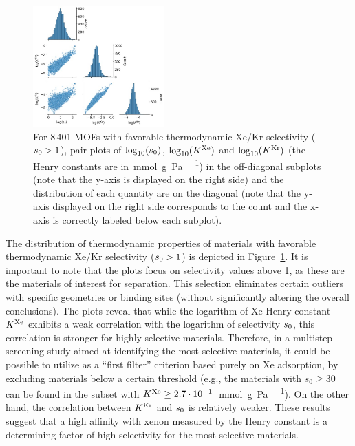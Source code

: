 \documentclass[main.tex]{subfiles}
\begin{document}
\begin{figure}[h]
  \centering
    \includegraphics[width=0.45\textwidth]{figures/2-thermo/Henry_0.jpg}
    \caption{For 8\,401 MOFs with favorable thermodynamic Xe/Kr selectivity ($s_{\text{0}} > 1$), pair plots of $\log_{\text{10}}(s_{\text{0}})$, $\log_{\text{10}}(K^{\text{Xe}})$ and $\log_{\text{10}}(K^{\text{Kr}})$ (the Henry constants are in~\si{\milli\mol\per\gram\per\pascal}) in the off-diagonal subplots (note that the y-axis is displayed on the right side) and the distribution of each quantity are on the diagonal (note that the y-axis displayed on the right side corresponds to the count and the x-axis is correctly labeled below each subplot).}\label{fgr:histo_K}
  \end{figure}
  
The distribution of thermodynamic properties of materials with favorable thermodynamic Xe/Kr selectivity ($s_{\text{0}} > 1$) is depicted in Figure~\ref{fgr:histo_K}. It is important to note that the plots focus on selectivity values above 1, as these are the materials of interest for separation. This selection eliminates certain outliers with specific geometries or binding sites (without significantly altering the overall conclusions). The plots reveal that while the logarithm of Xe Henry constant $K^{\text{Xe}}$ exhibits a weak correlation with the logarithm of selectivity $s_{\text{0}}$, this correlation is stronger for highly selective materials. Therefore, in a multistep screening study aimed at identifying the most selective materials, it could be possible to utilize as a ``first filter'' criterion based purely on Xe adsorption, by excluding materials below a certain threshold (e.g., the materials with $s_0\ge30$ can be found in the subset with $K^{\text{Xe}}\ge2.7\cdot10^{-1}$~\si{\milli\mol\per\gram\per\pascal}). On the other hand, the correlation between $K^{\text{Kr}}$ and $s_{\text{0}}$ is relatively weaker. These results suggest that a high affinity with xenon measured by the Henry constant is a determining factor of high selectivity for the most selective materials.  
\end{document}
